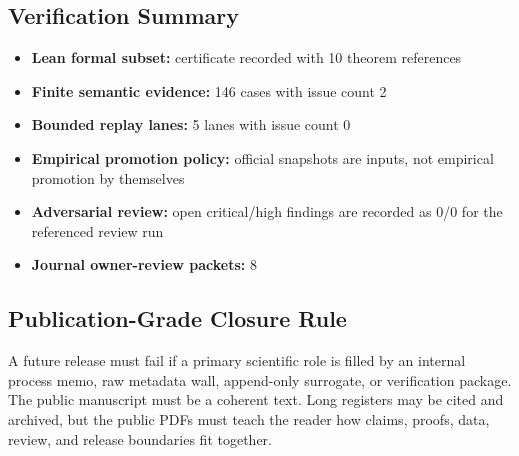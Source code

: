 \subsection{Verification Summary}

\begin{itemize}[leftmargin=1.8em]

\item \textbf{Lean formal subset:} certificate recorded with 10 theorem references

\item \textbf{Finite semantic evidence:} 146 cases with issue count 2

\item \textbf{Bounded replay lanes:} 5 lanes with issue count 0

\item \textbf{Empirical promotion policy:} official snapshots are inputs, not empirical promotion by themselves

\item \textbf{Adversarial review:} open critical/high findings are recorded as 0/0 for the referenced review run

\item \textbf{Journal owner-review packets:} 8

\end{itemize}

\subsection{Publication-Grade Closure Rule}

A future release must fail if a primary scientific role is filled by an internal process memo, raw metadata wall, append-only surrogate, or verification package. The public manuscript must be a coherent text. Long registers may be cited and archived, but the public PDFs must teach the reader how claims, proofs, data, review, and release boundaries fit together.
